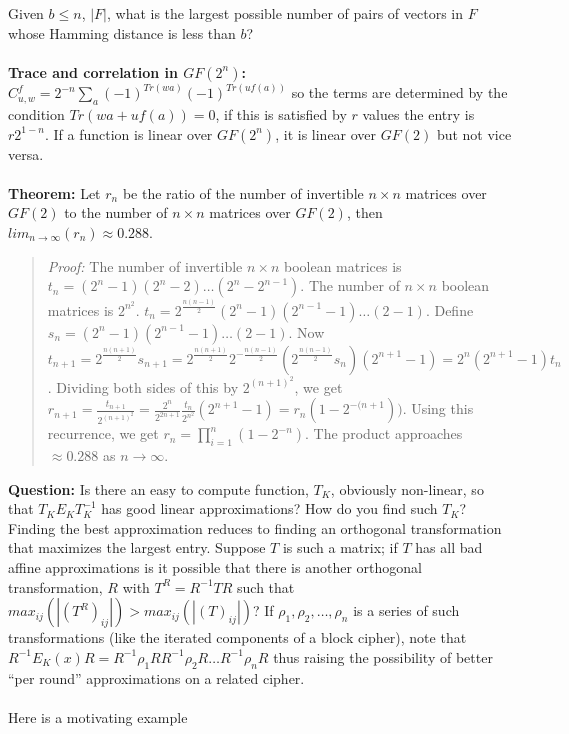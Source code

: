 Given $b \le n$, $|F|$, what is the largest possible number of pairs of vectors
in $F$ whose Hamming distance is less than $b$?
\\
\\
{\bf Trace and correlation in $GF(2^n)$:}
$C^f_{u,w}= 2^{-n} \sum_a  (-1)^{Tr(wa)} (-1)^{Tr(u f(a))}$ so the terms are
determined by the condition $Tr(wa+uf(a))=0$, if this is satisfied by $r$ values
the entry is $r 2^{1-n}$.  If a function is linear over $GF(2^n)$, it is linear
over $GF(2)$ but not vice versa.
\\
\\
{\bf Theorem:}
Let $r_n$ be the ratio of the number of invertible $n \times n$ matrices over
$GF(2)$ to the number of $n \times n$ matrices over $GF(2)$, then
$lim_{n \rightarrow \infty} (r_n) \approx 0.288$.
\begin{quote}
\emph{Proof:}
The number of invertible $n \times n$ boolean matrices is
$t_n= (2^n-1) (2^n-2) \ldots (2^n-2^{n-1})$.  
The number of $n \times n$ boolean matrices is $2^{n^2}$.
$t_n= 2^{\frac {n(n-1)} 2} (2^n-1)(2^{n-1}-1) \ldots (2-1)$. 
Define $s_n= (2^n-1)(2^{n-1}-1) \ldots (2-1)$.
Now 
$t_{n+1}= 
2^{\frac {n(n+1)} 2} s_{n+1}= 
2^{\frac {n(n+1)} 2} 2^{-{\frac {n(n-1)} 2}} (2^{\frac {n(n-1)} 2} s_{n}) (2^{n+1}-1)= 
2^n (2^{n+1}-1) t_{n}$.  
Dividing both sides of this by $2^{(n+1)^2}$, we get
$r_{n+1}= {\frac {t_{n+1}} {2^{(n+1)^2}}}= 
{\frac {2^n} {2^{2n+1}}} 
{\frac {t_{n} } {2^{n^2}}} (2^{n+1}-1) = r_n (1- 2^{-(n+1}))$.  
Using this recurrence, we get $r_n= \prod_{i=1}^n (1-2^{-n})$.
The product approaches $\approx 0.288$ as $n \rightarrow \infty$.
\end{quote}
{\bf Question:}  Is there an easy to compute function, $T_K$, obviously non-linear,
so that $T_K E_K T_K^{-1}$ has good linear approximations?
How do you find such $T_K$?
Finding the best approximation reduces to finding an orthogonal transformation that
maximizes the largest entry.  Suppose $T$ is such a matrix; if $T$ has all bad affine approximations
is it possible that there is another orthogonal transformation, $R$ with
$T^R= R^{-1} T R$
such that $max_{ij}(|(T^R)_{ij}|)> max_{ij}(|(T)_{ij}|)$? If 
$\rho_1 , \rho_2 , \ldots , \rho_n$ is a series of such transformations (like the iterated
components of a block cipher), note that $R^{-1} E_K(x) R= 
R^{-1} \rho_1 R
R^{-1} \rho_2 R \ldots
R^{-1} \rho_n R$ thus raising the possibility of better ``per round'' approximations on a
related cipher.
\\
\\
Here is a motivating example
